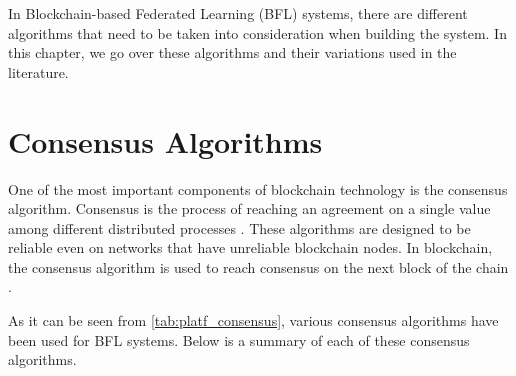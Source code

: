 In Blockchain-based Federated Learning (BFL) systems, there are different algorithms that need to be taken into consideration when building the system. In this chapter, we go over these algorithms and their variations used in the literature.

\section{Consensus Algorithms}\label{related_work:consensus_algorithms}

One of the most important components of blockchain technology is the consensus algorithm. Consensus is the process of reaching an agreement on a single value among different distributed processes \cite{9347812}. These algorithms are designed to be reliable even on networks that have unreliable blockchain nodes. In blockchain, the consensus algorithm is used to reach consensus on the next block of the chain \cite{9079513}.

As it can be seen from \autoref{tab:platf_consensus}, various consensus algorithms have been used for BFL systems. Below is a summary of each of these consensus algorithms.

